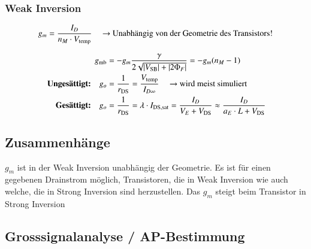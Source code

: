 \subsubsection{Weak Inversion}

\vspace{-0.3cm}

\[
    g_m = \frac{I_D}{n_M \cdot V_\text{temp}} \quad \text{ \textrightarrow\ Unabhängig von der Geometrie des Transistors!}
\]


\vspace{-0.15cm}

\begin{align*}
                                         g_{\rm mb} &= -g_m \frac{\gamma}{2 \sqrt{\abs{V_{\rm SB}} + \abs{2 \Phi_F}}} = - g_m (n_M - 1)                                             \\
    \text{ \textbf{Ungesättigt:}} \quad     g_o &= \frac{1}{r_{\rm DS}} = \frac{V_{\text{temp}}}{I_{D \infty}} \quad \text{ \textrightarrow\ wird meist simuliert}              \\
    \text{ \textbf{Gesättigt:}} \quad       g_o &=  \frac{1}{r_{\rm DS}} = \lambda \cdot  I_{\rm DS, sat} = \frac{I_D}{V_E + V_{\rm DS}}  \approx \frac{I_D}{a_E \cdot L + V_{\rm DS}}
\end{align*}



\subsection{Zusammenhänge}

$g_m$ ist in der Weak Inversion unabhängig der Geometrie. 
Es ist für einen gegebenen Drainstrom möglich, Transistoren, die in Weak Inversion wie auch welche, die in Strong Inversion sind herzustellen.
Das $g_m$ steigt beim Transistor in Strong Inversion 


\subsection{Grosssignalanalyse / AP-Bestimmung}
\label{Grosssignalanalyse / AP-Bestimmung}

